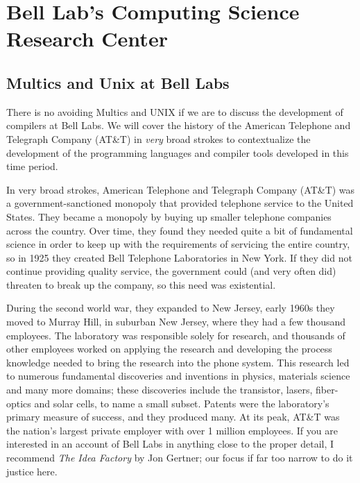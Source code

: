 \section{Bell Lab's Computing Science Research Center}

\subsection{Multics and Unix at Bell Labs}

There is no avoiding Multics and UNIX if we are to discuss the development of compilers at Bell Labs.
We will cover the history of the American Telephone and Telegraph Company (AT\&T)
in \textit{very} broad strokes to contextualize the development of the programming languages
and compiler tools developed in this time period.

In very broad strokes, American Telephone and Telegraph Company (AT\&T) was a government-sanctioned
monopoly that provided telephone service to the United States.
They became a monopoly by buying up smaller telephone companies across the country.
Over time, they found they needed quite a bit of fundamental science in order to keep up with the
requirements of servicing the entire country, so in 1925 they created Bell Telephone
Laboratories in New York. If they did not continue providing quality service, the government could
(and very often did) threaten to break up the company, so this need was existential.

During the second world war, they expanded to New Jersey, early 1960s they moved to Murray Hill,
in suburban New Jersey, where they had a few thousand employees.
The laboratory was responsible solely for research, and thousands of other employees
worked on applying the research and developing the process knowledge needed to bring the
research into the phone system.
This research led to numerous fundamental discoveries and inventions in physics,
materials science and many more domains; these discoveries include the transistor, lasers,
fiber-optics and solar cells, to name a small subset.
Patents were the laboratory's primary measure of success, and they produced many.
At its peak, AT\&T was the nation's largest private employer with over 1 million employees.
If you are interested in an account of Bell Labs in anything close to the proper detail,
I recommend \textit{The Idea Factory} by Jon Gertner; our focus if far too narrow to do
it justice here.

